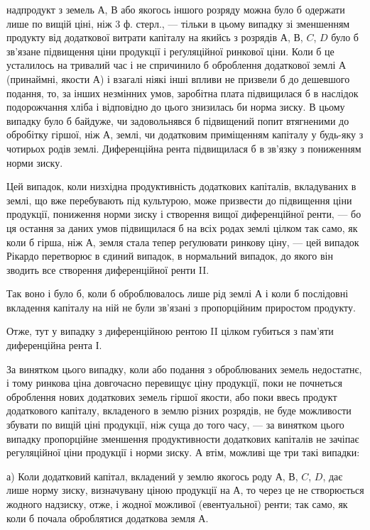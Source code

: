 \parcont{}  %
надпродукт з земель $А$, $В$ або якогось іншого розряду можна було б одержати
лише по вищій ціні, ніж 3 ф. стерл., — тільки в цьому випадку зі зменшенням
продукту від додаткової витрати капіталу на якийсь з розрядів $А$, $В$, $C$, $D$
було б зв’язане підвищення ціни продукції і реґуляційної ринкової ціни.
Коли б це усталилось на тривалий час і не спричинило б оброблення додаткової
землі $А$ (принаймні, якости $А$) і взагалі ніякі інші впливи не призвели б
до дешевшого подання, то, за інших незмінних умов, заробітна плата підвищилася б
в наслідок подорожчання хліба і відповідно до цього знизилась би норма зиску.
В цьому випадку було б байдуже, чи задовольнявся б підвищений попит втягненими
до обробітку гіршої, ніж $А$, землі, чи додатковим приміщенням капіталу
у будь-яку з чотирьох родів землі. Диференційна рента підвищилася б в зв’язку
з пониженням норми зиску.

Цей випадок, коли низхідна продуктивність додаткових капіталів, вкладуваних
в землі, що вже перебувають під культурою, може призвести до підвищення
ціни продукції, пониження норми зиску і створення вищої диференційної
ренти, — бо ця остання за даних умов підвищилася б на всіх родах землі
цілком так само, як коли б гірша, ніж $А$, земля стала тепер реґулювати ринкову
ціну, — цей випадок Рікардо перетворює в єдиний випадок, в нормальний
випадок, до якого він зводить все створення диференційної ренти II.

Так воно і було б, коли б оброблювалось лише рід землі $А$ і коли б послідовні
вкладення капіталу на ній не були зв’язані з пропорційним приростом
продукту.

Отже, тут у випадку з диференційною рентою II цілком губиться з пам’яти
диференційна рента І.

За винятком цього випадку, коли або подання з оброблюваних земель
недостатнє, і тому ринкова ціна довгочасно перевищує ціну продукції, поки не
почнеться оброблення нових додаткових земель гіршої якости, або поки ввесь продукт
додаткового капіталу, вкладеного в землю різних розрядів, не буде можливости
збувати по вищій ціні продукції, ніж суща до того часу, — за винятком
цього випадку пропорційне зменшення продуктивности додаткових капіталів не
зачіпає регуляційної ціни продукції і норми зиску. А втім, можливі ще три
такі випадки:

а) Коли додатковий капітал, вкладений у землю якогось роду $А$, $В$, $C$, $D$,
дає лише норму зиску, визначувану ціною продукції на $А$, то через це не
створюється жодного надзиску, отже, і жодної можливої (евентуальної) ренти;
так само, як коли б почала оброблятися додаткова земля $А$.

